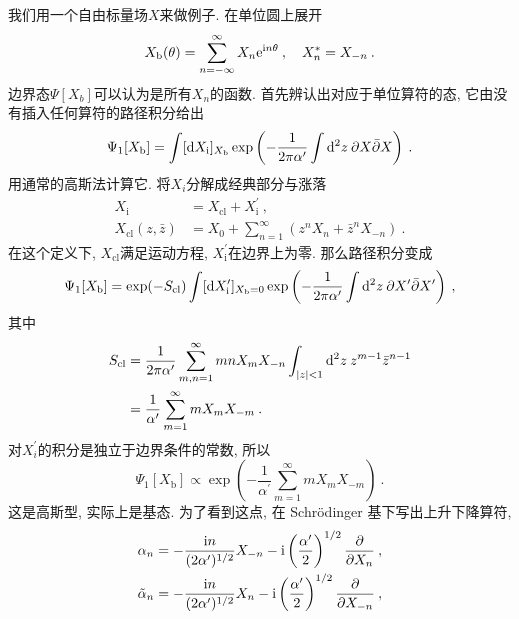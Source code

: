 我们用一个自由标量场$X$来做例子. 在单位圆上展开
\begin{equation}
X_{\mathrm{b}}(\theta)=\sum_{n=-\infty}^{\infty} X_{n} \mathrm{e}^{\mathrm{i} n \theta} \:, \quad X_{n}^{*}=X_{-n} \:. \label{2.8.19}
\end{equation}
边界态$\Psi[X_b]$可以认为是所有$X_n$的函数. 首先辨认出对应于单位算符的态, 它由没有插入任何算符的路径积分给出
\begin{equation}
\Psi_{1}[X_{\mathrm{b}}] = \int [\mathrm{d} X_{\mathrm{i}}]_{X_{\mathrm{b}}} \exp \left(-\frac{1}{2 \pi \alpha^{\prime}} 
\int \mathrm{d}^{2} z\: \partial X \bar{\partial} X\right) \:. \label{2.8.20}
\end{equation}
用通常的高斯法计算它. 将$X_i$分解成经典部分与涨落
\begin{subequations} \label{2.8.21}
\begin{align}
X_{\mathrm{i}}&=X_{\mathrm{cl}}+X_{\mathrm{i}}^{\prime} \:,\label{2.8.21a} \\
X_{\mathrm{cl}}(z, \bar{z})&=X_{0}+\sum_{n=1}^{\infty}\left(z^{n} X_{n}+\bar{z}^{n} X_{-n}\right)  \:. \label{2.8.21b}
\end{align}
\end{subequations}
在这个定义下, $X_{\text{cl}}$满足运动方程, $X_{\text{i}}^\prime$在边界上为零. 那么路径积分变成
\begin{equation}
\Psi_{1}[X_{\mathrm{b}}]=\exp (-S_{\mathrm{cl}}) \int [\mathrm{d} X_{\mathrm{i}}^{\prime}]_{X_{\mathrm{b}}=0} 
\exp \left(-\frac{1}{2 \pi \alpha^{\prime}} \int \mathrm{d}^{2} z\: \partial X^{\prime} \bar{\partial} X^{\prime}\right) \:,
\label{2.8.22}
\end{equation}
其中
\begin{align}
S_{\mathrm{cl}} &=\frac{1}{2 \pi \alpha^{\prime}} \sum_{m, n=1}^{\infty} m n X_{m} X_{-n} 
\int_{|z|<1} \mathrm{d}^{2} z\: z^{m-1} \bar{z}^{n-1}  \nonumber \\
&=\frac{1}{\alpha^{\prime}} \sum_{m=1}^{\infty} m X_{m} X_{-m} \:. \label{2.8.23}
\end{align}
对$X_i^\prime$的积分是独立于边界条件的常数, 所以
\begin{equation}\label{2.8.24}
\Psi_{1}[X_{\mathrm{b}}] \propto \exp \left(-\frac{1}{\alpha^{\prime}} \sum_{m=1}^{\infty} m X_{m} X_{-m}\right) \:.
\end{equation}
这是高斯型, 实际上是基态. 为了看到这点, 在 Schr\"{o}dinger 基下写出上升下降算符,
\begin{subequations} \label{2.8.25}
\begin{align}
\alpha_{n}=-\frac{\mathrm{i} n}{(2 \alpha^{\prime})^{1 / 2}} X_{-n}-\mathrm{i}\left(\frac{\alpha^{\prime}}{2}\right)^{1 / 2} \frac{\partial}{\partial X_{n}} \:, \label{2.8.25a} \\
\tilde{\alpha}_{n}=-\frac{\mathrm{i} n}{(2 \alpha^{\prime})^{1 / 2}} X_{n}-\mathrm{i}\left(\frac{\alpha^{\prime}}{2}\right)^{1 / 2} \frac{\partial}{\partial X_{-n}} \:, \label{2.8.25b} 
\end{align}
\end{subequations} 
